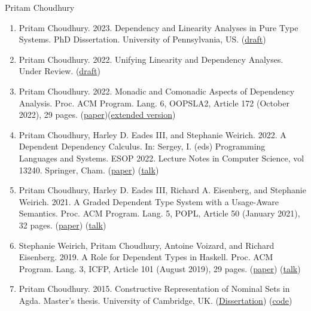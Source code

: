 \documentclass{scrartcl}
\begin{document}
\begin{cv}{Pritam Choudhury}
\begin{enumerate}
\item Pritam Choudhury. 2023. Dependency and Linearity Analyses in Pure Type Systems. PhD Dissertation. University of Pennsylvania, US. (\href{https://github.com/pritamChoudhury/PhDDissertationDraft/tree/master}{draft})
\item Pritam Choudhury. 2022. Unifying Linearity and Dependency Analyses. Under Review. (\href{https://github.com/pritamChoudhury/UnderReviewPaper/blob/master/paper.pdf}{draft})
\item Pritam Choudhury. 2022. Monadic and Comonadic Aspects of Dependency Analysis. Proc. ACM Program. Lang. 6, OOPSLA2, Article 172 (October 2022), 29 pages. (\href{https://doi.org/10.1145/3563335}{paper})(\href{https://arxiv.org/abs/2209.06334}{extended version})
\item Pritam Choudhury, Harley D. Eades III, and Stephanie Weirich. 2022. A Dependent Dependency Calculus. In: Sergey, I. (eds) Programming Languages and Systems. ESOP 2022. Lecture Notes in Computer Science, vol 13240. Springer, Cham. (\href{https://doi.org/10.1007/978-3-030-99336-8_15}{paper}) (\href{https://www.youtube.com/watch?v=e_heE6IoN8Y}{talk})
\item Pritam Choudhury, Harley D. Eades III, Richard A. Eisenberg, and Stephanie Weirich. 2021. A Graded Dependent Type System with a Usage-Aware Semantics. Proc. ACM Program. Lang. 5, POPL, Article 50 (January 2021), 32 pages. (\href{https://dl.acm.org/doi/10.1145/3434331}{paper}) (\href{https://www.youtube.com/watch?v=yrwtXrey7mE}{talk})
\item Stephanie Weirich, Pritam Choudhury, Antoine Voizard, and Richard Eisenberg. 2019. A Role for Dependent Types in Haskell. Proc. ACM Program. Lang. 3, ICFP, Article 101 (August 2019), 29 pages. (\href{https://dl.acm.org/doi/abs/10.1145/3341705}{paper}) (\href{https://www.youtube.com/watch?v=0udX2HqFUD8}{talk})
\item Pritam Choudhury. 2015. Constructive Representation of Nominal Sets in Agda. Master’s thesis. University of Cambridge, UK. (\href{https://www.cl.cam.ac.uk/~amp12/agda/choudhury/choudhury-dissertation.pdf}{Dissertation}) (\href{https://www.cl.cam.ac.uk/~amp12/agda/choudhury/html/README.html}{code})
\end{enumerate}



\end{cv}
\end{document}
